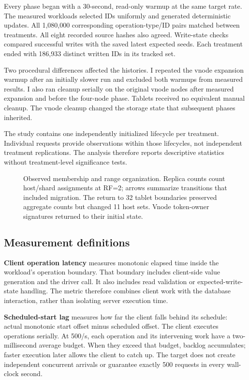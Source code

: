 Every phase began with a 30-second, read-only warmup at the same target rate. The measured workloads selected IDs uniformly and generated deterministic updates. All 1,080,000 corresponding operation-type/ID pairs matched between treatments. All eight recorded source hashes also agreed. Write-state checks compared successful writes with the saved latest expected seeds. Each treatment ended with 186,933 distinct written IDs in its tracked set.

Two procedural differences affected the histories. I repeated the vnode expansion warmup after an initially slower run and excluded both warmups from measured results. I also ran cleanup serially on the original vnode nodes after measured expansion and before the four-node phase. Tablets received no equivalent manual cleanup. The vnode cleanup changed the storage state that subsequent phases inherited.

The study contains one independently initialized lifecycle per treatment. Individual requests provide observations within those lifecycles, not independent treatment replications. The analysis therefore reports descriptive statistics without treatment-level significance tests.

\begin{figure}[H]
\centering
\resizebox{\textwidth}{!}{}
\caption{Observed membership and range organization. Replica counts count host/shard assignments at RF=2; arrows summarize transitions that included migration. The return to 32 tablet boundaries preserved aggregate counts but changed 11 host sets. Vnode token-owner signatures returned to their initial state.}\label{fig:topology}
\end{figure}

\newpage

\hypertarget{measurement-definitions}{%
\subsection{Measurement definitions}\label{measurement-definitions}}

\textbf{Client operation latency} measures monotonic elapsed time inside the workload's operation boundary. That boundary includes client-side value generation and the driver call. It also includes read validation or expected-write-state handling. The metric therefore combines client work with the database interaction, rather than isolating server execution time.

\textbf{Scheduled-start lag} measures how far the client falls behind its schedule: actual monotonic start offset minus scheduled offset. The client executes operations serially. At 500/s, each operation and its intervening work have a two-millisecond average budget. When they exceed that budget, backlog accumulates; faster execution later allows the client to catch up. The target does not create independent concurrent arrivals or guarantee exactly 500 requests in every wall-clock second.

